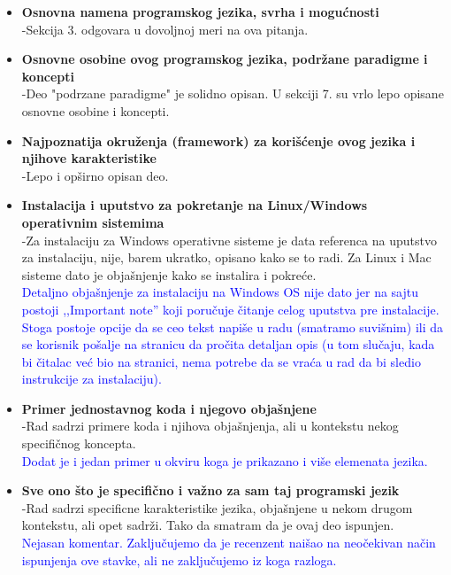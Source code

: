 \documentclass[a4paper]{report}
\newcommand{\odgovorAutora}[1]{\textcolor{blue}{#1}}
\begin{document}
\begin{enumerate}
\begin{itemize}
    \item \textbf {Osnovna namena programskog jezika, svrha i mogućnosti}\\
      -Sekcija 3. odgovara u dovoljnoj meri na ova pitanja.
    \item \textbf {Osnovne osobine ovog programskog jezika, podržane paradigme i koncepti}\\
      -Deo "podrzane paradigme" je solidno opisan. U sekciji 7. su vrlo lepo opisane osnovne osobine i koncepti.
    \item \textbf {Najpoznatija okruženja (framework) za korišćenje ovog jezika i njihove karakteristike}\\
      -Lepo i op\v sirno opisan deo.
    \item \textbf {Instalacija i uputstvo za pokretanje na Linux/Windows operativnim sistemima} \\
       -Za instalaciju za Windows operativne sisteme je data referenca na uputstvo za instalaciju, nije, barem ukratko, opisano kako se to radi. Za Linux i Mac sisteme dato je obja\v snjenje kako se instalira i pokre\' ce. \\
\odgovorAutora{Detaljno objašnjenje za instalaciju na Windows OS nije dato jer na sajtu postoji ,,Important note'' koji poručuje čitanje celog uputstva pre instalacije. Stoga postoje opcije da se ceo tekst napiše u radu (smatramo suvišnim) ili da se korisnik pošalje na stranicu da pročita detaljan opis (u tom slučaju, kada bi čitalac već bio na stranici, nema potrebe da se vraća u rad da bi sledio instrukcije za instalaciju).}
    \item \textbf {Primer jednostavnog koda i njegovo objašnjene}\\
      -Rad sadrzi primere koda i njihova obja\v snjenja, ali u kontekstu nekog specifi\v cnog koncepta. \\
\odgovorAutora{Dodat je i jedan primer u okviru koga je prikazano i više elemenata jezika.}
    \item \textbf {Sve ono što je specifično i važno za sam taj programski jezik} \\
      -Rad sadrzi specificne karakteristike jezika, obja\v snjene u nekom drugom kontekstu, ali opet sadr\v zi. Tako da smatram da je ovaj deo ispunjen. \\
\odgovorAutora{Nejasan komentar. Zaključujemo da je recenzent naišao na neočekivan način ispunjenja ove stavke, ali ne zaključujemo iz koga razloga.}
\end{itemize}


\end{enumerate}
\end{document}
